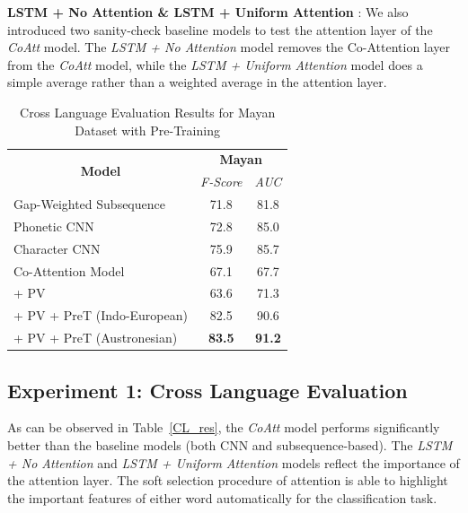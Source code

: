 \documentclass[11pt,letterpaper]{article}
\begin{document}
\textbf{LSTM + No Attention \& LSTM + Uniform Attention} : We also introduced two sanity-check baseline models to test the attention layer of the \textit{CoAtt} model. The \textit{LSTM + No Attention} model removes the Co-Attention layer from the \textit{CoAtt} model, while the \textit{LSTM + Uniform Attention} model does a simple average rather than a weighted average in the attention layer.

\begin{table}[htpb]
\centering
\begin{tabular}{lcc}
\multicolumn{1}{c}{\multirow{2}{*}{\textbf{Model}}} & \multicolumn{2}{c}{\textbf{Mayan}} \\ \cline{2-3} 
\multicolumn{1}{c}{}                                & \textit{F-Score}  & \textit{AUC}   \\ \hline
Gap-Weighted Subsequence                            & 71.8              & 81.8           \\
Phonetic CNN                                        & 72.8              & 85.0           \\
Character CNN                                       & 75.9              & 85.7           \\ \hline
Co-Attention Model                                  & 67.1              & 67.7           \\
\quad + PV                                          & 63.6              & 71.3           \\
\quad + PV + PreT (Indo-European)                   & 82.5              & 90.6           \\
\quad + PV + PreT (Austronesian)                    & \textbf{83.5}     & \textbf{91.2} 
\end{tabular}
\caption{Cross Language Evaluation Results for Mayan Dataset with Pre-Training }
\label{CL_res_2}
\end{table}
\subsection{Experiment 1: Cross Language Evaluation}

As can be observed in Table~\ref{CL_res}, the \textit{CoAtt} model performs significantly better than the baseline models (both CNN and subsequence-based). The \textit{LSTM + No Attention} and \textit{LSTM + Uniform Attention} models reflect the importance of the attention layer. The soft selection procedure of attention is able to highlight the important features of either word automatically for the classification task.  
\end{document}
